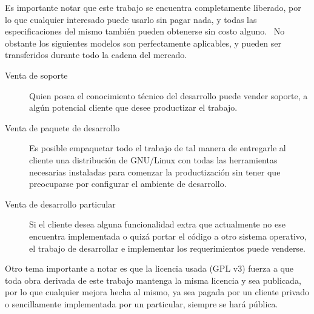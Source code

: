 Es importante notar que este trabajo se encuentra completamente liberado, por
lo que cualquier interesado puede usarlo sin pagar nada, y todas las
especificaciones del mismo tambi\'en pueden obtenerse sin costo alguno. \
No obstante los siguientes modelos son perfectamente aplicables, y pueden ser
transferidos durante todo la cadena del mercado.\\


\begin{description}
 \item[Venta de soporte] Quien posea el conocimiento t\'ecnico del desarrollo
puede vender soporte, a alg\'un potencial cliente que desee productizar el
trabajo. 

 \item[Venta de paquete de desarrollo] Es posible empaquetar todo el trabajo de
tal manera de entregarle al cliente una distribuci\'on de GNU/Linux con todas
las herramientas necesarias instaladas para comenzar la productizaci\'on sin
tener que preocuparse por configurar el ambiente de desarrollo. 

 \item[Venta de desarrollo particular] Si el cliente desea alguna
funcionalidad extra que actualmente no ese encuentra implementada o quiz\'a
portar el c\'odigo a otro sistema operativo, el trabajo de desarrollar e
implementar los requerimientos puede venderse.
\end{description}

Otro tema importante a notar es que la licencia usada (GPL v3) fuerza a que
toda obra derivada de este trabajo mantenga la misma licencia y sea publicada,
por lo que cualquier mejora hecha al mismo, ya sea pagada por un cliente
privado o sencillamente implementada por un particular, siempre se har\'a
p\'ublica.




